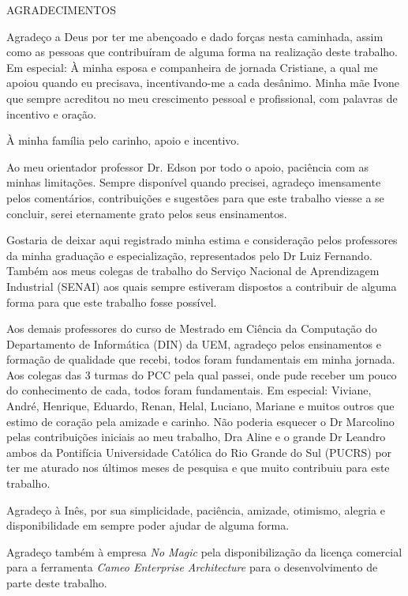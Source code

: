 \clearpage
\thispagestyle{empty}

\begin{center}	
	{\large AGRADECIMENTOS}
\end{center}
\normalsize
\noindent


Agradeço a Deus por ter me abençoado e dado forças nesta caminhada, assim como as pessoas que contribuíram de alguma forma na realização deste trabalho. Em especial: À minha esposa e companheira de jornada Cristiane, a qual me apoiou quando eu precisava, incentivando-me a cada desânimo. Minha mãe Ivone que sempre acreditou no meu crescimento pessoal e profissional, com palavras de incentivo e oração.

À minha família pelo carinho, apoio e incentivo.

Ao meu orientador professor Dr. Edson por todo o apoio, paciência com as minhas limitações. Sempre disponível quando precisei, agradeço imensamente pelos comentários, contribuições e sugestões para que este trabalho viesse a se concluir, serei eternamente grato pelos seus ensinamentos.

Gostaria de deixar aqui registrado minha estima e consideração pelos professores da minha graduação e especialização, representados pelo Dr Luiz Fernando. Também aos meus colegas de trabalho do Serviço Nacional de Aprendizagem Industrial (SENAI) aos quais sempre estiveram dispostos a contribuir de alguma forma para que este trabalho fosse possível.

Aos demais professores do curso de Mestrado em Ciência da Computação do Departamento de Informática (DIN) da UEM, agradeço pelos ensinamentos e formação de qualidade que recebi, todos foram fundamentais em minha jornada. Aos colegas das 3 turmas do PCC pela qual passei, onde pude receber um pouco do conhecimento de cada, todos foram fundamentais. Em especial: Viviane, André, Henrique, Eduardo, Renan, Helal, Luciano, Mariane e muitos outros que estimo de coração pela amizade e carinho. Não poderia esquecer o Dr Marcolino pelas contribuições iniciais ao meu trabalho, Dra Aline e o grande Dr Leandro ambos da Pontifícia Universidade Católica do Rio Grande do Sul (PUCRS) por ter me aturado nos últimos meses de pesquisa e que muito contribuiu para este trabalho.

Agradeço à Inês, por sua simplicidade, paciência, amizade, otimismo, alegria e disponibilidade em sempre poder ajudar de alguma forma.

Agradeço também à empresa \textit{No Magic} pela disponibilização da licença comercial para a ferramenta \textit{Cameo Enterprise Architecture} para o desenvolvimento de parte deste trabalho.

